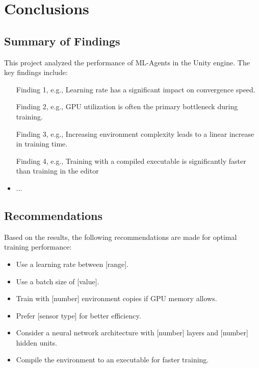 \section{Conclusions}

\subsection{Summary of Findings}
This project analyzed the performance of ML-Agents in the Unity engine. The key findings include:
\begin{itemize}
    \item [Finding 1, e.g., Learning rate has a significant impact on convergence speed.]
    \item [Finding 2, e.g., GPU utilization is often the primary bottleneck during training.]
    \item [Finding 3, e.g., Increasing environment complexity leads to a linear increase in training time.]
    \item [Finding 4, e.g., Training with a compiled executable is significantly faster than training in the editor]
    \item ...
\end{itemize}

\subsection{Recommendations}
Based on the results, the following recommendations are made for optimal training performance:
\begin{itemize}
    \item Use a learning rate between [range].
    \item Use a batch size of [value].
    \item Train with [number] environment copies if GPU memory allows.
    \item Prefer [sensor type] for better efficiency.
    \item Consider a neural network architecture with [number] layers and [number] hidden units.
    \item Compile the environment to an executable for faster training.
\end{itemize}


